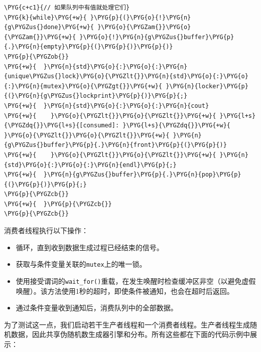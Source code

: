 \begin{codeblockbg}
\begin{Verbatim}[commandchars=\\\{\},breaklines=true,breakanywhere=true,fontsize=\codefont,xleftmargin=17bp]
\PYG{c+c1}{// 如果队列中有值就处理它们}
\PYG{k}{while}\PYG{+w}{ }\PYG{p}{(}\PYG{o}{!}\PYG{n}{g\PYGZus{}done}\PYG{+w}{ }\PYG{o}{\PYGZam{}}\PYG{o}{\PYGZam{}}\PYG{+w}{ }\PYG{o}{!}\PYG{n}{g\PYGZus{}buffer}\PYG{p}{.}\PYG{n}{empty}\PYG{p}{(}\PYG{p}{)}\PYG{p}{)}
\PYG{p}{\PYGZob{}}
\PYG{+w}{  }\PYG{n}{std}\PYG{o}{:}\PYG{o}{:}\PYG{n}{unique\PYGZus{}lock}\PYG{o}{\PYGZlt{}}\PYG{n}{std}\PYG{o}{:}\PYG{o}{:}\PYG{n}{mutex}\PYG{o}{\PYGZgt{}}\PYG{+w}{ }\PYG{n}{locker}\PYG{p}{(}\PYG{n}{g\PYGZus{}lockprint}\PYG{p}{)}\PYG{p}{;}
\PYG{+w}{  }\PYG{n}{std}\PYG{o}{:}\PYG{o}{:}\PYG{n}{cout}
\PYG{+w}{    }\PYG{o}{\PYGZlt{}}\PYG{o}{\PYGZlt{}}\PYG{+w}{ }\PYG{l+s}{\PYGZdq{}}\PYG{l+s}{[consumed]: }\PYG{l+s}{\PYGZdq{}}\PYG{+w}{ }\PYG{o}{\PYGZlt{}}\PYG{o}{\PYGZlt{}}\PYG{+w}{ }\PYG{n}{g\PYGZus{}buffer}\PYG{p}{.}\PYG{n}{front}\PYG{p}{(}\PYG{p}{)}
\PYG{+w}{    }\PYG{o}{\PYGZlt{}}\PYG{o}{\PYGZlt{}}\PYG{+w}{ }\PYG{n}{std}\PYG{o}{:}\PYG{o}{:}\PYG{n}{endl}\PYG{p}{;}
\PYG{+w}{  }\PYG{n}{g\PYGZus{}buffer}\PYG{p}{.}\PYG{n}{pop}\PYG{p}{(}\PYG{p}{)}\PYG{p}{;}
\PYG{p}{\PYGZcb{}}
\PYG{+w}{  }\PYG{p}{\PYGZcb{}}
\PYG{p}{\PYGZcb{}}
\end{Verbatim}
\end{codeblockbg}



消费者线程执行以下操作：



\begin{itemize}
\item 循环，直到收到数据生成过程已经结束的信号。



\item 获取与条件变量关联的\texttt{mutex}上的唯一锁。



\item 使用接受谓词的\texttt{wait\_\allowbreak{}for()}重载，在发生唤醒时检查缓冲区非空（以避免虚假唤醒）。该方法使用1秒的超时，即使条件被通知，也会在超时后返回。



\item 通过条件变量收到通知后，消费队列中的全部数据。

\end{itemize}



为了测试这一点，我们启动若干生产者线程和一个消费者线程。生产者线程生成随机数据，因此共享伪随机数生成器引擎和分布。所有这些都在下面的代码示例中展示：


